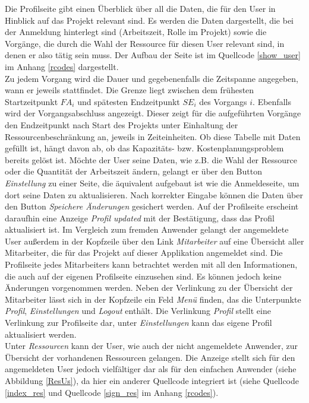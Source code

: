 \documentclass[a4paper,12pt,parskip,bibtotoc,liststotoc]{article}
\begin{document}
Die Profilseite gibt einen Überblick über all die Daten, die für den User in Hinblick auf das Projekt relevant sind. Es werden die Daten dargestellt, die bei der Anmeldung hinterlegt sind (Arbeitszeit, Rolle im Projekt) sowie die Vorgänge, die durch die Wahl der Ressource für diesen User relevant sind, in denen er also tätig sein muss. Der Aufbau der Seite ist im Quellcode \ref{show_user} im Anhang \ref{rcodes} dargestellt.\\

Zu jedem Vorgang wird die Dauer und gegebenenfalls die Zeitspanne angegeben, wann er jeweils stattfindet. Die Grenze liegt zwischen dem frühesten Startzeitpunkt $FA_{i}$ und spätesten Endzeitpunkt $SE_{i}$ des Vorgangs $i$. Ebenfalls wird der Vorgangsabschluss angezeigt. Dieser zeigt für die aufgeführten Vorgänge den Endzeitpunkt nach Start des Projekts unter Einhaltung der Ressourcenbeschränkung an, jeweils in Zeiteinheiten. Ob diese Tabelle mit Daten gefüllt ist, hängt davon ab, ob das Kapazitäts- bzw. Kostenplanungsproblem bereits gelöst ist. Möchte der User seine Daten, wie z.B. die Wahl der Ressource oder die Quantität der Arbeitszeit ändern, gelangt er über den Button \textit{Einstellung} zu einer Seite, die äquivalent aufgebaut ist wie die Anmeldeseite, um dort seine Daten zu aktualisieren. Nach korrekter Eingabe können die Daten über den Button \textit{Speichere Änderungen} gesichert werden. Auf der Profilseite erscheint daraufhin eine Anzeige \textit{Profil updated} mit der Bestätigung, dass das Profil aktualisiert ist. Im Vergleich zum fremden Anwender gelangt der angemeldete User außerdem in der Kopfzeile über den Link \textit{Mitarbeiter} auf eine Übersicht aller Mitarbeiter, die für das Projekt auf dieser Applikation angemeldet sind. Die Profilseite jedes Mitarbeiters kann betrachtet werden mit all den Informationen, die auch auf der eigenen Profilseite einzusehen sind. Es können jedoch keine Änderungen vorgenommen werden. Neben der Verlinkung zu der Übersicht der Mitarbeiter lässt sich in der Kopfzeile ein Feld \textit{Menü} finden, das die Unterpunkte \textit{Profil}, \textit{Einstellungen} und \textit{Logout} enthält. Die Verlinkung \textit{Profil} stellt eine Verlinkung zur Profilseite dar, unter \textit{Einstellungen} kann das eigene Profil aktualisiert werden.\\

Unter \textit{Ressourcen} kann der User, wie auch der nicht angemeldete Anwender, zur Übersicht der vorhandenen Ressourcen gelangen. Die Anzeige stellt sich für den angemeldeten User jedoch vielfältiger dar als für den einfachen Anwender (siehe Abbildung \ref{ResUs}), da hier ein anderer Quellcode integriert ist (siehe Quellcode \ref{index_res} und Quellcode \ref{sign_res} im Anhang \ref{rcodes}).\\
\end{document}

